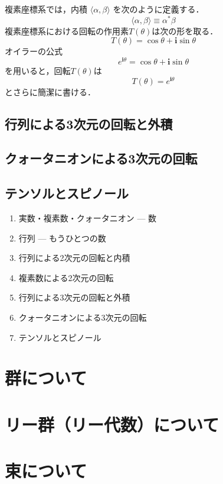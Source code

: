 \documentclass{jsbook}
\newcommand{\im}{\mathbf{i}}
\newcommand{\ee}{\mathit{e}}
\begin{document}
複素座標系では，内積 $\langle\alpha,\beta\rangle$ を次のように定義する．
\begin{equation}
\langle\alpha,\beta\rangle\equiv\alpha^*\beta
\end{equation}
複素座標系における回転の作用素$T(\theta)$は次の形を取る．
\begin{equation}
T(\theta)=\cos\theta+\im\sin\theta
\end{equation}
%
%
オイラーの公式
\begin{equation}
\ee^{\im\theta}=\cos\theta+\im\sin\theta
\end{equation}
を用いると，回転$T(\theta)$は
\begin{equation}
T(\theta)=\ee^{\im\theta}
\end{equation}
とさらに簡潔に書ける．

\section{行列による3次元の回転と外積}
\section{クォータニオンによる3次元の回転}
\section{テンソルとスピノール}

\begin{enumerate}
\item 実数・複素数・クォータニオン --- 数
\item 行列 --- もうひとつの数
\item 行列による2次元の回転と内積
\item 複素数による2次元の回転
\item 行列による3次元の回転と外積
\item クォータニオンによる3次元の回転
\item テンソルとスピノール
\end{enumerate}


\chapter{群について}

\chapter{リー群（リー代数）について}

\chapter{束について}
\end{document}
